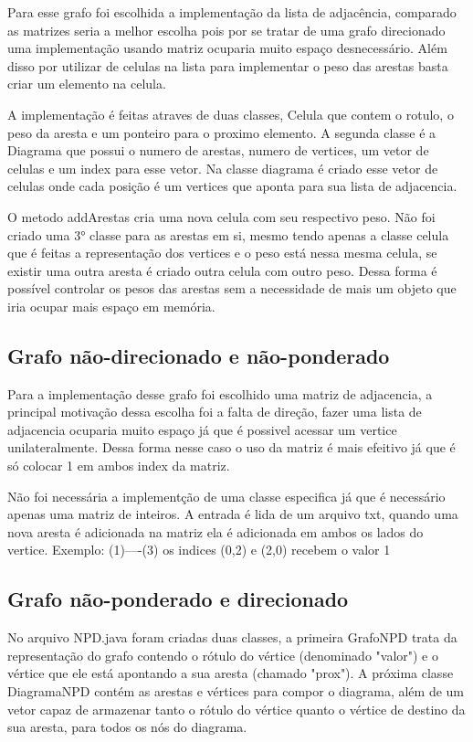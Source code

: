 \documentclass[12pt]{article}
\begin{document}
Para esse grafo foi escolhida a implementação da lista de adjacência, comparado as matrizes seria a melhor escolha pois por se tratar de uma grafo direcionado uma implementação usando matriz ocuparia muito espaço desnecessário. Além disso por utilizar de celulas na lista para implementar o peso das arestas basta criar um elemento na celula.

A implementação é feitas atraves de duas classes, Celula que contem o rotulo, o peso da aresta e um ponteiro para o proximo elemento.
A segunda classe é a Diagrama que possui o numero de arestas, numero de vertices, um vetor de celulas e um index para esse vetor.
Na classe diagrama é criado esse vetor de celulas onde cada posição é um vertices que aponta para sua lista de adjacencia.

O metodo addArestas cria uma nova celula com seu respectivo peso. Não foi criado uma 3° classe para as arestas em si, mesmo tendo apenas a classe celula que é feitas a representação dos vertices e o peso está nessa mesma celula, se existir uma outra aresta é criado outra celula com outro peso. Dessa forma é possível controlar os pesos das arestas sem a necessidade de mais um objeto que iria ocupar mais espaço em memória.

\subsection{Grafo não-direcionado e não-ponderado}
Para a implementação desse grafo foi escolhido uma matriz de adjacencia, a principal motivação dessa escolha foi a falta de direção, fazer uma lista de adjacencia ocuparia muito espaço já que é possivel acessar um vertice unilateralmente. Dessa forma nesse caso o uso da matriz é mais efeitivo já que é só colocar 1 em ambos index da matriz.
    
    Não foi necessária a implementção de uma classe especifica já que
é necessário apenas uma matriz de inteiros. 
A entrada é lida de um arquivo txt, quando uma nova aresta é adicionada na matriz ela é adicionada em ambos os lados do vertice.
Exemplo:
(1)----(3)
os indices (0,2) e (2,0) recebem o valor 1

\subsection{Grafo não-ponderado e direcionado}

No arquivo NPD.java foram criadas duas classes, a primeira GrafoNPD trata da representação do grafo contendo o rótulo do vértice (denominado "valor") e o vértice que ele está apontando a sua aresta (chamado "prox"). A próxima classe DiagramaNPD contém as arestas e vértices para compor o diagrama, além de um vetor capaz de armazenar tanto o rótulo do vértice quanto o vértice de destino da sua aresta, para todos os nós do diagrama.
\end{document}
